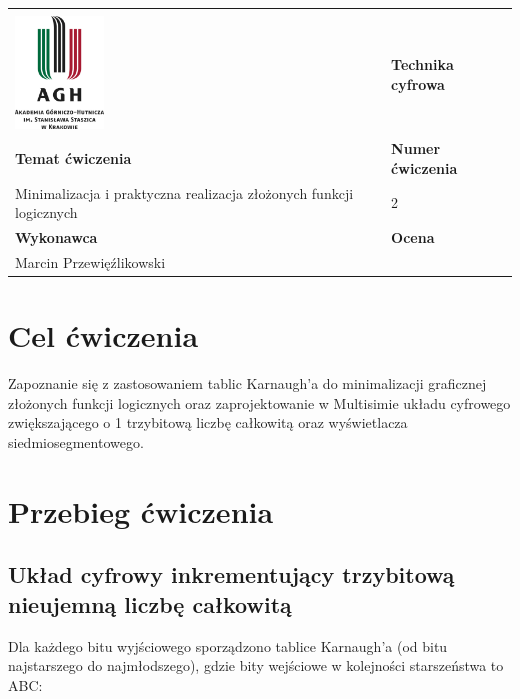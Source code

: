 \documentclass[12pt,a4paper]{article}
\begin{document}
\begin{table}[]
\label{my-label}
\begin{tabular}{|p{7.5cm}|p{7.5cm}|}
\hline
									           					&                           \\
\includegraphics[height=3cm]{logo}             					& \textbf{Technika cyfrowa} \\ \hline
\multicolumn{1}{|l|}{\textbf{Temat ćwiczenia}} 					& \textbf{Numer ćwiczenia}  \\
\multicolumn{1}{|l|}{Minimalizacja i praktyczna realizacja złożonych funkcji logicznych}	& 2                         \\ \hline
\multicolumn{1}{|l|}{\textbf{Wykonawca}}       & \textbf{Ocena}            \\
\multicolumn{1}{|l|}{Marcin Przewięźlikowski}          &                           \\ \hline
\end{tabular}
\end{table}

\section{Cel ćwiczenia}


Zapoznanie się z zastosowaniem tablic Karnaugh'a do minimalizacji graficznej złożonych funkcji logicznych oraz zaprojektowanie w Multisimie układu cyfrowego zwiększającego o 1 trzybitową liczbę całkowitą oraz wyświetlacza siedmiosegmentowego.

\section{Przebieg ćwiczenia}

\subsection{Układ cyfrowy inkrementujący trzybitową nieujemną liczbę całkowitą}
Dla każdego bitu wyjściowego sporządzono tablice Karnaugh'a (od bitu najstarszego do najmłodszego), gdzie bity wejściowe w kolejności starszeństwa to ABC:\\
\end{document}
